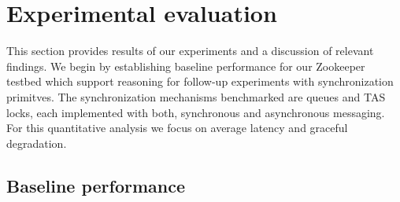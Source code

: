\section{Experimental evaluation}\label{sec:eval}
This section provides results of our experiments and a discussion of relevant findings. We begin by establishing baseline performance for our Zookeeper testbed which support reasoning for follow-up experiments with synchronization primitves. The synchronization mechanisms benchmarked are queues and TAS locks, each implemented with both, synchronous and asynchronous messaging. For this quantitative analysis we focus on average latency and graceful degradation.




\subsection{Baseline performance}

